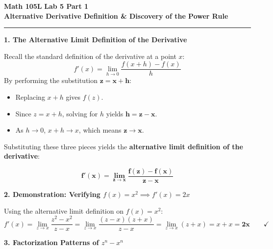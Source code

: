 \documentclass[10.5pt]{article}
\begin{document}
\noindent \textbf{\large Math 105L} \hfill \textbf{\large Lab 5 Part 1}\\[1pt]
{\textbf{\Large Alternative Derivative Definition \& Discovery of the Power Rule}}\\[-5pt]
\rule{\textwidth}{1.2pt}

\vspace{0.03in}

\textbf{\large 1. The Alternative Limit Definition of the Derivative}

Recall the standard definition of the derivative at a point $x$:
\[
  f'(x) = \lim_{h\to 0} \frac{f(x+h) - f(x)}{h}
\]
By performing the substitution $\mathbf{z = x + h}$:
\begin{itemize}[leftmargin=1.2em, topsep=1pt, itemsep=2pt]
  \item Replacing $x+h$ gives $f(z)$.
  \item Since $z = x+h$, solving for $h$ yields $\mathbf{h = z - x}$.
  \item As $h \to 0$, $x+h \to x$, which means $\mathbf{z \to x}$.
\end{itemize}

Substituting these three pieces yields the \textbf{alternative limit definition of the derivative}:
\begin{tcolorbox}[colback=boxbg, colframe=boxframe, boxrule=0.8pt, arc=3pt, left=8pt, right=8pt, top=4pt, bottom=4pt]
\[
  \mathbf{f'(x) = \lim_{z\to x} \frac{f(z) - f(x)}{z - x}}
\]
\end{tcolorbox}

\vspace{0.03in}

\textbf{\large 2. Demonstration: Verifying $f(x) = x^2 \implies f'(x) = 2x$}

Using the alternative limit definition on $f(x) = x^2$:
\[
  f'(x) = \lim_{z\to x} \frac{z^2 - x^2}{z - x} = \lim_{z\to x} \frac{(z-x)(z+x)}{z-x} = \lim_{z\to x} (z+x) = x + x = \mathbf{2x} \qquad \checkmark
\]

\vspace{0.04in}

\textbf{\large 3. Factorization Patterns of $z^n - x^n$}
\end{document}
